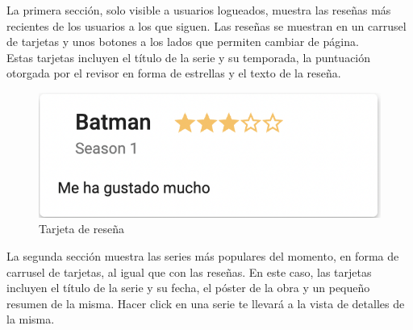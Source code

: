 La primera sección, solo visible a usuarios logueados, muestra las reseñas más recientes de los usuarios a los que
siguen. Las reseñas se muestran en un carrusel de tarjetas y unos botones a los lados que permiten cambiar de página.\\

Estas tarjetas incluyen el título de la serie y su temporada, la puntuación otorgada por el revisor en forma de
estrellas y el texto de la reseña.\\

\begin{figure}[H]
    \centering	
        \includegraphics[scale=0.5]{img/review-card.png}
    \caption{ Tarjeta de reseña }\label{fig:review-card}
\end{figure}

La segunda sección muestra las series más populares del momento, en forma de carrusel de tarjetas, al igual que con las
reseñas. En este caso, las tarjetas incluyen el título de la serie y su fecha, el póster de la obra y un pequeño resumen
de la misma. Hacer click en una serie te llevará a la vista de detalles de la misma.\\

